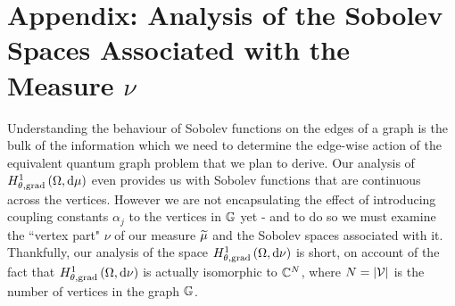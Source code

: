 \section{Appendix: Analysis of the Sobolev Spaces Associated with the Measure $\nu$} \label{app:VertexAnalysis}
Understanding the behaviour of Sobolev functions on the edges of a graph is the bulk of the information which we need to determine the edge-wise action of the equivalent quantum graph problem that we plan to derive.
Our analysis of $H^1_{\theta, \mathrm{grad}}\left( \Omega, \mathrm{d}\mu \right)$ even provides us with Sobolev functions that are continuous across the vertices.
However we are not encapsulating the effect of introducing coupling constants $\alpha_j$ to the vertices in $\mathbb{G}$ yet - and to do so we must examine the ``vertex part" $\nu$ of our measure $\widetilde{\mu}$ and the Sobolev spaces associated with it.
Thankfully, our analysis of the space $H^1_{\theta, \mathrm{grad}}\left( \Omega, \mathrm{d}\nu \right)$ is short, on account of the fact that $H^1_{\theta, \mathrm{grad}}\left( \Omega, \mathrm{d}\nu \right)$ is actually isomorphic  to $\mathbb{C}^N$, where $N=\left\lvert \mathcal{V} \right\rvert$ is the number of vertices in the graph $\mathbb{G}$.

